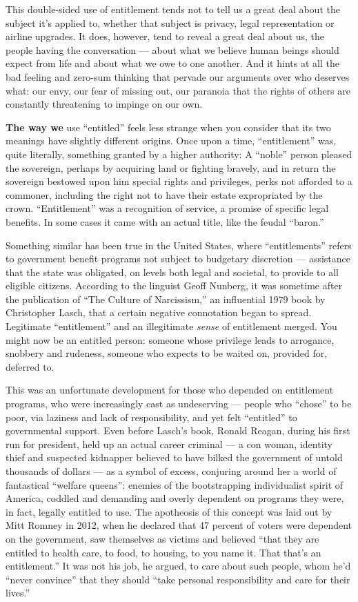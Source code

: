 This double-sided use of entitlement tends not to tell us a great deal
about the subject it's applied to, whether that subject is privacy,
legal representation or airline upgrades. It does, however, tend to
reveal a great deal about us, the people having the conversation ---
about what we believe human beings should expect from life and about
what we owe to one another. And it hints at all the bad feeling and
zero-sum thinking that pervade our arguments over who deserves what: our
envy, our fear of missing out, our paranoia that the rights of others
are constantly threatening to impinge on our own.

\textbf{The way we} use ``entitled'' feels less strange when you
consider that its two meanings have slightly different origins. Once
upon a time, ``entitlement'' was, quite literally, something granted by
a higher authority: A ``noble'' person pleased the sovereign, perhaps by
acquiring land or fighting bravely, and in return the sovereign bestowed
upon him special rights and privileges, perks not afforded to a
commoner, including the right not to have their estate expropriated by
the crown. ``Entitlement'' was a recognition of service, a promise of
specific legal benefits. In some cases it came with an actual title,
like the feudal ``baron.''

Something similar has been true in the United States, where
``entitlements'' refers to government benefit programs not subject to
budgetary discretion --- assistance that the state was obligated, on
levels both legal and societal, to provide to all eligible citizens.
According to the linguist Geoff Nunberg, it was sometime after the
publication of ``The Culture of Narcissism,'' an influential 1979 book
by Christopher Lasch, that a certain negative connotation began to
spread. Legitimate ``entitlement'' and an illegitimate \emph{sense} of
entitlement merged. You might now be an entitled person: someone whose
privilege leads to arrogance, snobbery and rudeness, someone who expects
to be waited on, provided for, deferred to.

This was an unfortunate development for those who depended on
entitlement programs, who were increasingly cast as undeserving ---
people who ``chose'' to be poor, via laziness and lack of
responsibility, and yet felt ``entitled'' to governmental support. Even
before Lasch's book, Ronald Reagan, during his first run for president,
held up an actual career criminal --- a con woman, identity thief and
suspected kidnapper believed to have bilked the government of untold
thousands of dollars --- as a symbol of excess, conjuring around her a
world of fantastical ``welfare queens'': enemies of the bootstrapping
individualist spirit of America, coddled and demanding and overly
dependent on programs they were, in fact, legally entitled to use. The
apotheosis of this concept was laid out by Mitt Romney in 2012, when he
declared that 47 percent of voters were dependent on the government, saw
themselves as victims and believed ``that they are entitled to health
care, to food, to housing, to you name it. That that's an entitlement.''
It was not his job, he argued, to care about such people, whom he'd
``never convince'' that they should ``take personal responsibility and
care for their lives.''

